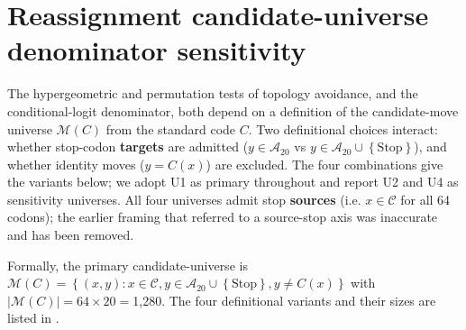 \documentclass[preprint,11pt,authoryear,a4paper]{elsarticle}
\begin{document}
\protect{}\label{fig:s-rho-robustness}{}

\section{Reassignment candidate-universe denominator
sensitivity}\label{sec:s-denominator}

The hypergeometric and permutation tests of topology avoidance, and the
conditional-logit denominator, both depend on a definition of the
candidate-move universe \(\mathcal{M}(C)\) from the standard code \(C\).
Two definitional choices interact: whether stop-codon \textbf{targets}
are admitted (\(y \in \mathcal{A}_{20}\) vs
\(y \in \mathcal{A}_{20} \cup \left\{ \text{Stop} \right\}\)), and
whether identity moves (\(y = C(x)\)) are excluded. The four
combinations give the variants below; we adopt U1 as primary throughout
and report U2 and U4 as sensitivity universes. All four universes admit
stop \textbf{sources} (i.e. \(x \in \mathcal{C}\) for all 64 codons);
the earlier framing that referred to a source-stop axis was inaccurate
and has been removed.

Formally, the primary candidate-universe is
\(\mathcal{M}(C) = \left\{ (x,y):x \in \mathcal{C},y \in \mathcal{A}_{20} \cup \left\{ \text{Stop} \right\},y \neq C(x) \right\}\)
with \(\left| {\mathcal{M}(C)} \right| = 64 \times 20 =\)1,280. The four
definitional variants and their sizes are listed in
.
\end{document}
